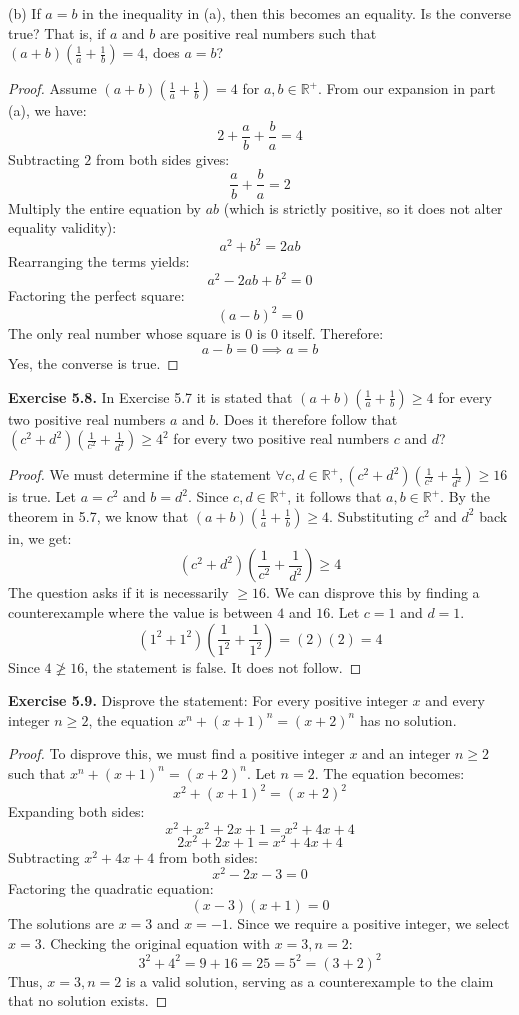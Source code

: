 \documentclass[11pt, letterpaper]{article}
\theoremstyle{remark}
\newcommand{\R}{\mathbb{R}}
\begin{document}
(b) If $a = b$ in the inequality in (a), then this becomes an equality. Is the converse true? That is, if $a$ and $b$ are positive real numbers such that $(a+b)\left(\frac{1}{a} + \frac{1}{b}\right) = 4$, does $a = b$?
\begin{proof}
Assume $(a+b)\left(\frac{1}{a} + \frac{1}{b}\right) = 4$ for $a, b \in \R^+$.
From our expansion in part (a), we have:
\[ 2 + \frac{a}{b} + \frac{b}{a} = 4 \]
Subtracting $2$ from both sides gives:
\[ \frac{a}{b} + \frac{b}{a} = 2 \]
Multiply the entire equation by $ab$ (which is strictly positive, so it does not alter equality validity):
\[ a^2 + b^2 = 2ab \]
Rearranging the terms yields:
\[ a^2 - 2ab + b^2 = 0 \]
Factoring the perfect square:
\[ (a - b)^2 = 0 \]
The only real number whose square is $0$ is $0$ itself. Therefore:
\[ a - b = 0 \implies a = b \]
Yes, the converse is true.
\end{proof}

\textbf{Exercise 5.8.} In Exercise 5.7 it is stated that $(a+b)\left(\frac{1}{a} + \frac{1}{b}\right) \ge 4$ for every two positive real numbers $a$ and $b$. Does it therefore follow that $(c^2+d^2)\left(\frac{1}{c^2} + \frac{1}{d^2}\right) \ge 4^2$ for every two positive real numbers $c$ and $d$?
\begin{proof}
We must determine if the statement $\forall c, d \in \R^+, (c^2+d^2)\left(\frac{1}{c^2} + \frac{1}{d^2}\right) \ge 16$ is true.
Let $a = c^2$ and $b = d^2$. Since $c, d \in \R^+$, it follows that $a, b \in \R^+$.
By the theorem in 5.7, we know that $(a+b)\left(\frac{1}{a} + \frac{1}{b}\right) \ge 4$.
Substituting $c^2$ and $d^2$ back in, we get:
\[ (c^2+d^2)\left(\frac{1}{c^2} + \frac{1}{d^2}\right) \ge 4 \]
The question asks if it is necessarily $\ge 16$. We can disprove this by finding a counterexample where the value is between $4$ and $16$.
Let $c = 1$ and $d = 1$.
\[ (1^2+1^2)\left(\frac{1}{1^2} + \frac{1}{1^2}\right) = (2)(2) = 4 \]
Since $4 \not\ge 16$, the statement is false. It does not follow.
\end{proof}

\textbf{Exercise 5.9.} Disprove the statement: For every positive integer $x$ and every integer $n \ge 2$, the equation $x^n + (x+1)^n = (x+2)^n$ has no solution.
\begin{proof}
To disprove this, we must find a positive integer $x$ and an integer $n \ge 2$ such that $x^n + (x+1)^n = (x+2)^n$.
Let $n = 2$. The equation becomes:
\[ x^2 + (x+1)^2 = (x+2)^2 \]
Expanding both sides:
\[ x^2 + x^2 + 2x + 1 = x^2 + 4x + 4 \]
\[ 2x^2 + 2x + 1 = x^2 + 4x + 4 \]
Subtracting $x^2 + 4x + 4$ from both sides:
\[ x^2 - 2x - 3 = 0 \]
Factoring the quadratic equation:
\[ (x - 3)(x + 1) = 0 \]
The solutions are $x = 3$ and $x = -1$. Since we require a positive integer, we select $x = 3$.
Checking the original equation with $x = 3, n = 2$:
\[ 3^2 + 4^2 = 9 + 16 = 25 = 5^2 = (3+2)^2 \]
Thus, $x = 3, n = 2$ is a valid solution, serving as a counterexample to the claim that no solution exists.
\end{proof}
\end{document}

